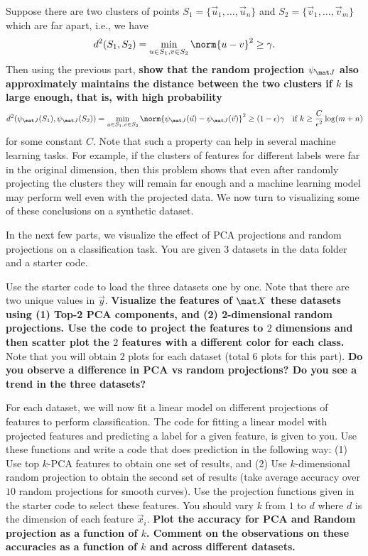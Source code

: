 \documentclass[preview]{standalone}
\begin{document}
\begin{Parts}
\Part Suppose there are two clusters of points $S_1 = \{\vec u_1, \ldots, \vec u_n \}$
and $S_2 = \{\vec v_1, \ldots, \vec v_m \}$ which are far apart, i.e., we have
\begin{align*}
	d^2(S_1, S_2) = \min_{u \in S_1, v \in S_2} \norm{u-v}^2 \geq \gamma.
\end{align*}
Then using the previous part, {\bf show that the random projection $\psi_{\mat J}$
also approximately maintains the distance between the two clusters if $k$ is large enough, 
that is, with high probability
}
\begin{align*}
	d^2(\psi_{\mat J}(S_1), \psi_{\mat J}(S_2)) = \min_{u \in S_1, v \in S_2}\norm{\psi_{\mat J}(\vec u) - \psi_{\mat J}(\vec v)}^2 \geq (1-\epsilon)\gamma \quad \text{if } k \geq \frac{C}{\epsilon^2} \log(m+n)
\end{align*}
for some constant $C$.
Note that such a property can help in several machine learning tasks.
For example, if the clusters of features for different labels were far
in the original dimension, then this problem shows that even after 
randomly projecting the clusters they will remain far enough and a 
machine learning model may perform well even with the projected data.
We now turn to visualizing some of these conclusions on a synthetic dataset.




\Part In the next few parts, we visualize the effect of PCA projections and random
projections on a classification task. You are given 3 datasets in the data folder
and a starter code.

Use the starter code to load the three datasets one by one.
Note that there are two unique values in $\vec y$.
{\bf Visualize the features of $\mat X$ these datasets using (1) Top-2 PCA components, and (2)
2-dimensional random projections. Use the code to project the 
features to $2$ dimensions and then scatter plot the $2$ features
with a different color for each class.}
Note that you will obtain $2$ plots for each dataset (total 6 plots for this part). 
{\bf Do you observe a difference in PCA vs random projections? Do you see a trend in the three datasets?}






\Part For each dataset, we will now fit a linear model on different projections of features 
to perform classification. The code for fitting a linear model with projected features
and predicting a label for a given feature, is given to you. Use these functions
and write a code that does prediction in the following way: (1) Use top $k$-PCA features to obtain
one set of results, and (2) Use $k$-dimensional random projection to obtain
the second set of results (take average accuracy over $10$ random projections for smooth curves). 
Use the projection functions given in the starter code to select these features.
You should vary $k$ from $1$ to $d$ where $d$ is the dimension of each feature $\vec x_i$. 
{\bf Plot the accuracy for PCA and Random projection as a function of $k$.
Comment on the observations on these accuracies as a function of $k$ and across different datasets.}




\end{Parts}
\end{document}
